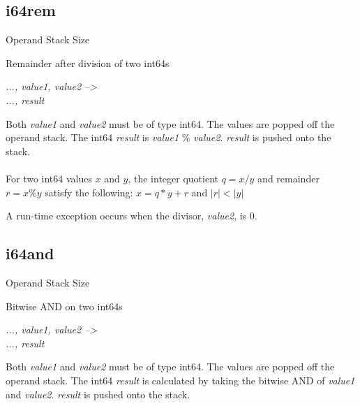 \documentclass[12pt]{article}
\begin{document}
		\newpage
		\subsection*{i64rem}
			\begin{labeling}{Operand Stack Size}
				\item [\textbf{Operation}] Remainder after division of two int64s
				\item [\textbf{Format}] 
				\item [\textbf{Operand Stack}] \textit{..., value1, value2 --\textgreater } \\
										\textit{..., result}
				\item [\textbf{Description}] Both \textit{value1} and \textit{value2} must be of type int64. The values are popped off the operand stack. The int64 \textit{result} is \textit{value1} \% \textit{value2}. \textit{result} is pushed onto the stack. \\ \\
				For two int64 values \(x\) and \(y\), the integer quotient \(q = x / y\) and remainder \(r = x \% y\) satisfy the following: \(x = q*y + r\)  and \(|r| < |y|\) \\ 
				 
				 \item [\textbf{Exception}] A run-time exception occurs when the divisor, \textit{value2}, is 0. 
			\end{labeling}		
			
		\newpage
		\subsection*{i64and}
			\begin{labeling}{Operand Stack Size}
				\item [\textbf{Operation}] Bitwise AND on two int64s
				\item [\textbf{Format}] 
				\item [\textbf{Operand Stack}] \textit{..., value1, value2 --\textgreater } \\
										\textit{..., result}
				\item [\textbf{Description}] Both \textit{value1} and \textit{value2} must be of type int64. The values are popped off the operand stack. The int64 \textit{result} is calculated by taking the bitwise AND of \textit{value1} and \textit{value2}. \textit{result} is pushed onto the stack. \\ \\
			\end{labeling}	
			
\end{document}
